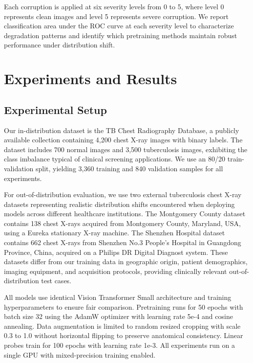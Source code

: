 \documentclass[11pt,a4paper]{article}
\begin{document}
Each corruption is applied at six severity levels from 0 to 5, where level 0 represents clean images and level 5 represents severe corruption. We report classification area under the ROC curve at each severity level to characterize degradation patterns and identify which pretraining methods maintain robust performance under distribution shift.

\section{Experiments and Results}

\subsection{Experimental Setup}

Our in-distribution dataset is the TB Chest Radiography Database, a publicly available collection containing 4,200 chest X-ray images with binary labels. The dataset includes 700 normal images and 3,500 tuberculosis images, exhibiting the class imbalance typical of clinical screening applications. We use an 80/20 train-validation split, yielding 3,360 training and 840 validation samples for all experiments.

For out-of-distribution evaluation, we use two external tuberculosis chest X-ray datasets representing realistic distribution shifts encountered when deploying models across different healthcare institutions. The Montgomery County dataset contains 138 chest X-rays acquired from Montgomery County, Maryland, USA, using a Eureka stationary X-ray machine. The Shenzhen Hospital dataset contains 662 chest X-rays from Shenzhen No.3 People's Hospital in Guangdong Province, China, acquired on a Philips DR Digital Diagnost system. These datasets differ from our training data in geographic origin, patient demographics, imaging equipment, and acquisition protocols, providing clinically relevant out-of-distribution test cases.

All models use identical Vision Transformer Small architecture and training hyperparameters to ensure fair comparison. Pretraining runs for 50 epochs with batch size 32 using the AdamW optimizer with learning rate 5e-4 and cosine annealing. Data augmentation is limited to random resized cropping with scale 0.3 to 1.0 without horizontal flipping to preserve anatomical consistency. Linear probes train for 100 epochs with learning rate 1e-3. All experiments run on a single GPU with mixed-precision training enabled.
\end{document}
